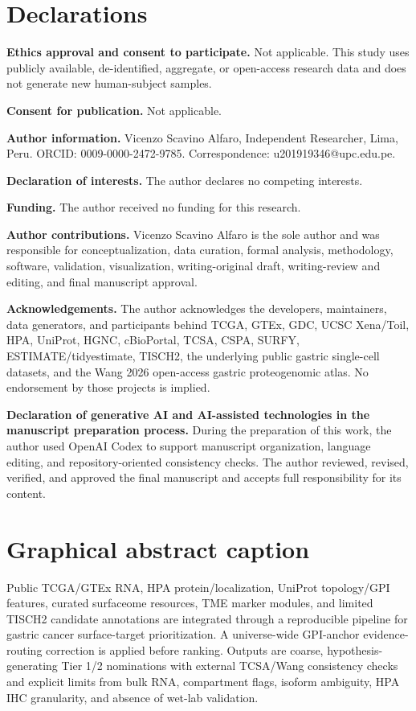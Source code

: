 \documentclass[twocolumn]{article}
\begin{document}
\section*{Declarations}

\textbf{Ethics approval and consent to participate.} Not applicable. This study uses publicly available, de-identified, aggregate, or open-access research data and does not generate new human-subject samples.

\textbf{Consent for publication.} Not applicable.

\textbf{Author information.} Vicenzo Scavino Alfaro, Independent Researcher, Lima, Peru. ORCID: 0009-0000-2472-9785. Correspondence: u201919346@upc.edu.pe.

\textbf{Declaration of interests.} The author declares no competing interests.

\textbf{Funding.} The author received no funding for this research.

\textbf{Author contributions.} Vicenzo Scavino Alfaro is the sole author and was responsible for conceptualization, data curation, formal analysis, methodology, software, validation, visualization, writing-original draft, writing-review and editing, and final manuscript approval.

\textbf{Acknowledgements.} The author acknowledges the developers, maintainers, data generators, and participants behind TCGA, GTEx, GDC, UCSC Xena/\allowbreak{}Toil, HPA, UniProt, HGNC, cBioPortal, TCSA, CSPA, SURFY, ESTIMATE/\allowbreak{}tidyestimate, TISCH2, the underlying public gastric single-cell datasets, and the Wang 2026 open-access gastric proteogenomic atlas. No endorsement by those projects is implied.

\textbf{Declaration of generative AI and AI-assisted technologies in the manuscript preparation process.} During the preparation of this work, the author used OpenAI Codex to support manuscript organization, language editing, and repository-oriented consistency checks. The author reviewed, revised, verified, and approved the final manuscript and accepts full responsibility for its content.

\section*{Graphical abstract caption}

Public TCGA/\allowbreak{}GTEx RNA, HPA protein/\allowbreak{}localization, UniProt topology/\allowbreak{}GPI features, curated surfaceome resources, TME marker modules, and limited TISCH2 candidate annotations are integrated through a reproducible pipeline for gastric cancer surface-target prioritization. A universe-wide GPI-anchor evidence-routing correction is applied before ranking. Outputs are coarse, hypothesis-generating Tier 1/\allowbreak{}2 nominations with external TCSA/\allowbreak{}Wang consistency checks and explicit limits from bulk RNA, compartment flags, isoform ambiguity, HPA IHC granularity, and absence of wet-lab validation.


\end{document}
